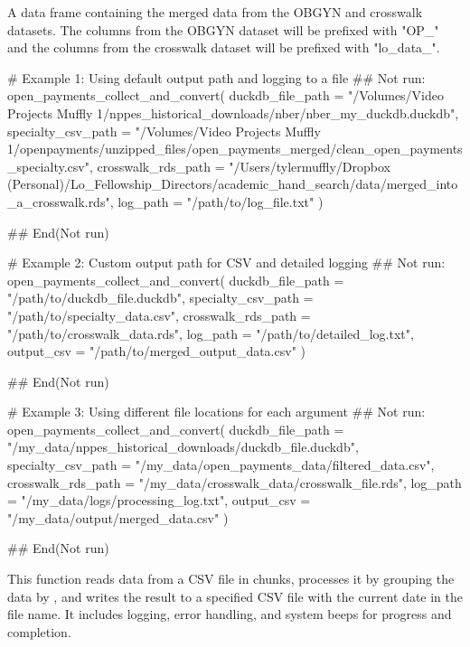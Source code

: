 \documentclass[a4paper]{book}
\begin{document}
%
\begin{Value}
A data frame containing the merged data from the OBGYN and crosswalk datasets. The columns from the OBGYN dataset will be prefixed with "OP\_" and the columns from the crosswalk dataset will be prefixed with "lo\_data\_".
\end{Value}
%
\begin{Examples}
\begin{ExampleCode}
# Example 1: Using default output path and logging to a file
## Not run: 
open_payments_collect_and_convert(
  duckdb_file_path = "/Volumes/Video Projects Muffly 1/nppes_historical_downloads/nber/nber_my_duckdb.duckdb",
  specialty_csv_path = "/Volumes/Video Projects Muffly 1/openpayments/unzipped_files/open_payments_merged/clean_open_payments_specialty.csv",
  crosswalk_rds_path = "/Users/tylermuffly/Dropbox (Personal)/Lo_Fellowship_Directors/academic_hand_search/data/merged_into_a_crosswalk.rds",
  log_path = "/path/to/log_file.txt"
)

## End(Not run)

# Example 2: Custom output path for CSV and detailed logging
## Not run: 
open_payments_collect_and_convert(
  duckdb_file_path = "/path/to/duckdb_file.duckdb",
  specialty_csv_path = "/path/to/specialty_data.csv",
  crosswalk_rds_path = "/path/to/crosswalk_data.rds",
  log_path = "/path/to/detailed_log.txt",
  output_csv = "/path/to/merged_output_data.csv"
)

## End(Not run)

# Example 3: Using different file locations for each argument
## Not run: 
open_payments_collect_and_convert(
  duckdb_file_path = "/my_data/nppes_historical_downloads/duckdb_file.duckdb",
  specialty_csv_path = "/my_data/open_payments_data/filtered_data.csv",
  crosswalk_rds_path = "/my_data/crosswalk_data/crosswalk_file.rds",
  log_path = "/my_data/logs/processing_log.txt",
  output_csv = "/my_data/output/merged_data.csv"
)

## End(Not run)

\end{ExampleCode}
\end{Examples}
%
\begin{Description}
This function reads data from a CSV file in chunks, processes it by grouping the data by ,
and writes the result to a specified CSV file with the current date in the file name. It includes logging,
error handling, and system beeps for progress and completion.
\end{Description}
\end{document}
